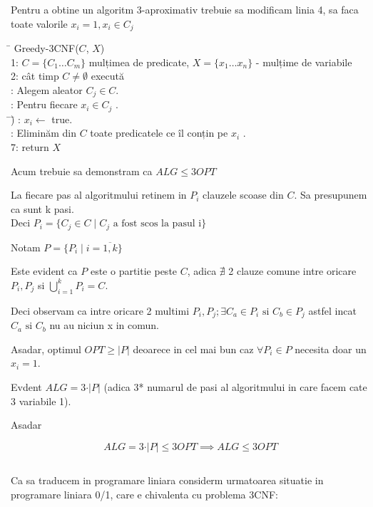 \documentclass[a4paper]{report}
\begin{document}
Pentru a obtine un algoritm 3-aproximativ trebuie sa modificam linia 4, sa faca toate valorile $x_{i}=1, x_{i} \in C_{j}$

\begin{tabbing}
\hspace{2em}\= \kill 
Greedy-3CNF($C$, $X$)\\
1: $C=\{C_{1}\dots C_{m}\}$ mulțimea de predicate, $X=\{x_{1}\dots x_{n}\}$ - mulțime de variabile\\ 
2: cât timp $C\neq \emptyset$ execută\\ 
: Alegem aleator $C_{j}\in C$.\\
: Pentru fiecare $x_{i} \in C_{j}$ .\\
\hspace{2em}\= \hspace{2em}\=)\kill 
\> : $x_{i}\leftarrow$ true.\\
\> : Eliminăm din $C$ toate predicatele ce îl conțin pe $x_{i}$ .\\
7: return $X$\\
\end{tabbing}

Acum trebuie sa demonstram ca $ALG\leq 3OPT$

La fiecare pas al algoritmului retinem in $P_{i}$ clauzele scoase din $C$. Sa presupunem ca sunt k pasi.\\

Deci $P_{i}=\{C_{j}\in C \mid C_{j}\text{ a fost scos la pasul i}\}$ 

Notam $P=\{P_{i} \mid i=\overline{1,k}\}$

Este evident ca $P$ este o partitie peste $C$, adica $\nexists$ 2 clauze comune intre oricare $P_{i}, P_{j}$ si $\bigcup\limits_{i=1}^{k} P_{i}=C$.

Deci observam ca intre oricare 2 multimi $P_{i}, P_{j}; \exists C_{a}\in P_{i} \text{ si } C_{b}\in P_{j}$ astfel incat $C_{a} \text{ si } C_{b}$ nu au niciun x in comun.

Asadar, optimul $OPT\geq \vert P\vert$ deoarece in cel mai bun caz $\forall P_{i}\in P$ necesita doar un $x_{i}=1$.

Evdent $ALG=3\cdot \vert P \vert$ (adica 3* numarul de pasi al algoritmului in care facem cate 3 variabile 1).

Asadar

\[ALG=3\cdot \vert P\vert \leq 3OPT \implies ALG\leq 3OPT\]

\subsection{}
Ca sa traducem in programare liniara considerm urmatoarea situatie in programare liniara 0/1, care e chivalenta cu problema 3CNF:
\end{document}
